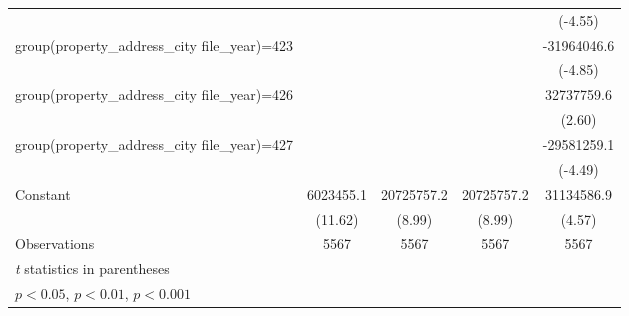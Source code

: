 {\begin{tabular}{l*{4}{c}}
                    &                     &                     &                     &     (-4.55)         \\
\addlinespace
group(property\_address\_city file\_year)=423&                     &                     &                     & -31964046.6\sym{***}\\
                    &                     &                     &                     &     (-4.85)         \\
\addlinespace
group(property\_address\_city file\_year)=426&                     &                     &                     &  32737759.6\sym{**} \\
                    &                     &                     &                     &      (2.60)         \\
\addlinespace
group(property\_address\_city file\_year)=427&                     &                     &                     & -29581259.1\sym{***}\\
                    &                     &                     &                     &     (-4.49)         \\
\addlinespace
Constant            &   6023455.1\sym{***}&  20725757.2\sym{***}&  20725757.2\sym{***}&  31134586.9\sym{***}\\
                    &     (11.62)         &      (8.99)         &      (8.99)         &      (4.57)         \\
\midrule
Observations        &        5567         &        5567         &        5567         &        5567         \\
\bottomrule
\multicolumn{5}{l}{\footnotesize \textit{t} statistics in parentheses}\\
\multicolumn{5}{l}{\footnotesize \sym{*} \(p<0.05\), \sym{**} \(p<0.01\), \sym{***} \(p<0.001\)}\\
\end{tabular}
}
